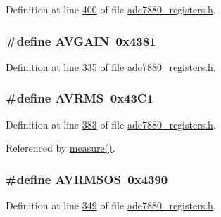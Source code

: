 Definition at line \hyperlink{a00036_source_l00400}{400} of file \hyperlink{a00036_source}{ade7880\-\_\-registers.\-h}.

\hypertarget{a00036_a71e3b41bc58cad314fbc2d9739265921}{
\subsubsection[{A\-V\-G\-A\-I\-N}]{\setlength{\rightskip}{0pt plus 5cm}\#define A\-V\-G\-A\-I\-N~0x4381}}\label{de/d8c/a00036_a71e3b41bc58cad314fbc2d9739265921}


Definition at line \hyperlink{a00036_source_l00335}{335} of file \hyperlink{a00036_source}{ade7880\-\_\-registers.\-h}.

\hypertarget{a00036_ae4c7fedd5702010e6907a686a35c1fa8}{
\subsubsection[{A\-V\-R\-M\-S}]{\setlength{\rightskip}{0pt plus 5cm}\#define A\-V\-R\-M\-S~0x43\-C1}}\label{de/d8c/a00036_ae4c7fedd5702010e6907a686a35c1fa8}


Definition at line \hyperlink{a00036_source_l00383}{383} of file \hyperlink{a00036_source}{ade7880\-\_\-registers.\-h}.



Referenced by \hyperlink{a00042_source_l00040}{measure()}.

\hypertarget{a00036_ac77c2a7c4fa3473fb51e9f62a9df39e1}{
\subsubsection[{A\-V\-R\-M\-S\-O\-S}]{\setlength{\rightskip}{0pt plus 5cm}\#define A\-V\-R\-M\-S\-O\-S~0x4390}}\label{de/d8c/a00036_ac77c2a7c4fa3473fb51e9f62a9df39e1}


Definition at line \hyperlink{a00036_source_l00349}{349} of file \hyperlink{a00036_source}{ade7880\-\_\-registers.\-h}.

